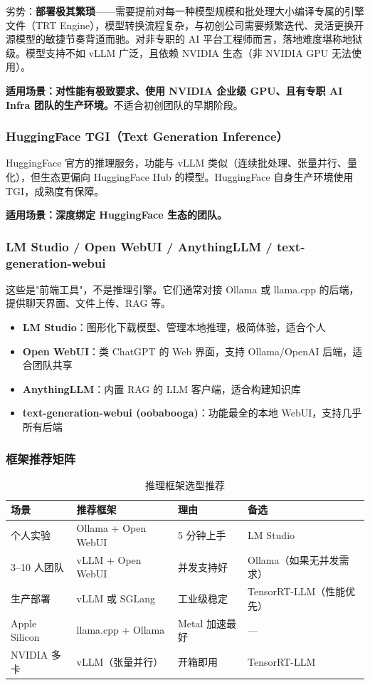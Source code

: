 \documentclass[UTF8,a4paper,10pt,oneside]{ctexart}
\begin{document}
劣势：\textbf{部署极其繁琐}——需要提前对每一种模型规模和批处理大小编译专属的引擎文件（TRT Engine），模型转换流程复杂，与初创公司需要频繁迭代、灵活更换开源模型的敏捷节奏背道而驰。对非专职的 AI 平台工程师而言，落地难度堪称地狱级。模型支持不如 vLLM 广泛，且依赖 NVIDIA 生态（非 NVIDIA GPU 无法使用）。

\textbf{适用场景：对性能有极致要求、使用 NVIDIA 企业级 GPU、且有专职 AI Infra 团队的生产环境。}不适合初创团队的早期阶段。

\subsubsection{HuggingFace TGI（Text Generation Inference）}

HuggingFace 官方的推理服务，功能与 vLLM 类似（连续批处理、张量并行、量化），但生态更偏向 HuggingFace Hub 的模型。HuggingFace 自身生产环境使用 TGI，成熟度有保障。

\textbf{适用场景：深度绑定 HuggingFace 生态的团队。}

\subsubsection{LM Studio / Open WebUI / AnythingLLM / text-generation-webui}

这些是"前端工具"，不是推理引擎。它们通常对接 Ollama 或 llama.cpp 的后端，提供聊天界面、文件上传、RAG 等。

\begin{itemize}
    \item \textbf{LM Studio}：图形化下载模型、管理本地推理，极简体验，适合个人
    \item \textbf{Open WebUI}：类 ChatGPT 的 Web 界面，支持 Ollama/OpenAI 后端，适合团队共享
    \item \textbf{AnythingLLM}：内置 RAG 的 LLM 客户端，适合构建知识库
    \item \textbf{text-generation-webui (oobabooga)}：功能最全的本地 WebUI，支持几乎所有后端
\end{itemize}

\subsubsection{框架推荐矩阵}

\begin{table}[htbp]
\centering
\caption{推理框架选型推荐}
\begin{tabular}{p{2.2cm}p{4cm}p{2.5cm}p{4.5cm}}
\hline
\textbf{场景} & \textbf{推荐框架} & \textbf{理由} & \textbf{备选} \\
\hline
个人实验 & Ollama + Open WebUI & 5 分钟上手 & LM Studio \\
3--10 人团队 & vLLM + Open WebUI & 并发支持好 & Ollama（如果无并发需求）\\
生产部署 & vLLM 或 SGLang & 工业级稳定 & TensorRT-LLM（性能优先）\\
Apple Silicon & llama.cpp + Ollama & Metal 加速最好 & — \\
NVIDIA 多卡 & vLLM（张量并行） & 开箱即用 & TensorRT-LLM \\
\hline
\end{tabular}
\end{table}
\end{document}
